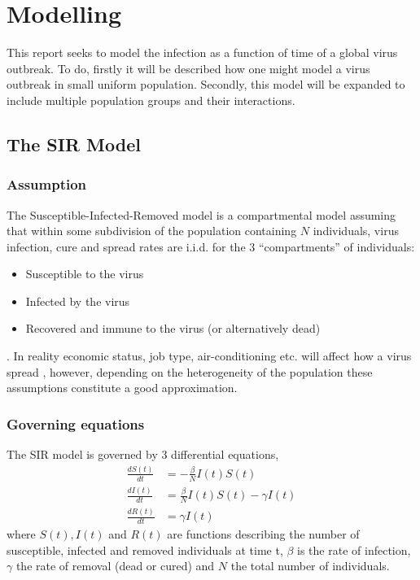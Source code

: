 \section{Modelling}
This report seeks to model the infection as a function of time of a global virus outbreak. To do, firstly it will be described how one might model a virus outbreak in small uniform population. Secondly, this model will be expanded to include multiple population groups and their interactions.

\subsection{The SIR Model}
\subsubsection{Assumption}
The Susceptible-Infected-Removed model is a compartmental model assuming that within some subdivision of the population containing $N$ individuals, virus infection, cure and spread rates are i.i.d. for the 3 ``compartments'' of individuals:
\begin{itemize}
	\item Susceptible to the virus
	\item Infected by the virus
	\item Recovered and immune to the virus (or alternatively dead)
\end{itemize} 
. In reality economic status, job type, air-conditioning etc. will affect how a virus spread \cite{zika-modelling}, however, depending on the heterogeneity of the population these assumptions constitute a good approximation.

\subsubsection{Governing equations}
The SIR model is governed by 3 differential equations,
\begin{align}
\frac{d S(t)}{dt} &= - \frac{\beta}{N} I(t) S(t)   \label{eq-S}\\
\frac{d I(t)}{dt} &= \frac{\beta}{N} I(t) S(t) - \gamma I(t)  \label{eq-I}\\
\frac{d R(t)}{dt} &= \gamma I(t) \label{eq-R}
\end{align}
where $S(t), I(t)$ and $R(t)$ are functions describing the number of susceptible, infected and removed individuals at time t, $\beta$ is the rate of infection, $\gamma$ the rate of removal (dead or cured) and $N$ the total number of individuals.

